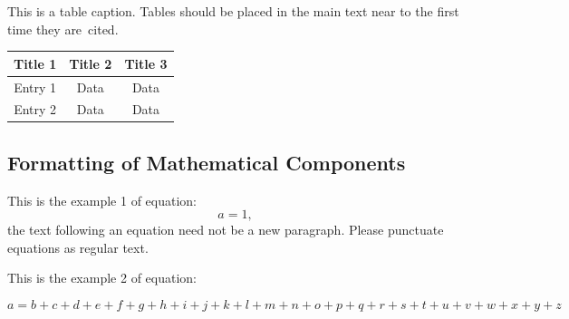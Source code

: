 \documentclass[journal,article,submit,moreauthors,pdftex]{Definitions/mdpi}
\begin{document}
\begin{paracol}{2}
    \begin{specialtable}[H] 
        \caption{This is a table caption. Tables should be placed in the main text near to the first time they are~cited.\label{tab1}}
        \begin{tabular}{ccc}
            \toprule
            \textbf{Title 1}    & \textbf{Title 2}  & \textbf{Title 3}\\
            \midrule
            Entry 1     & Data          & Data\\
            Entry 2     & Data          & Data\\
            \bottomrule
        \end{tabular}
    \end{specialtable}
    
    
    \subsection{Formatting of Mathematical Components}
    
    This is the example 1 of equation:
    \begin{equation}
        a = 1,
    \end{equation}
    the text following an equation need not be a new paragraph. Please punctuate equations as regular text.
    
    This is the example 2 of equation:
\end{paracol}
\nointerlineskip
\begin{equation}
    a = b + c + d + e + f + g + h + i + j + k + l + m + n + o + p + q + r + s + t + u + v + w + x + y + z
\end{equation}
\end{document}
